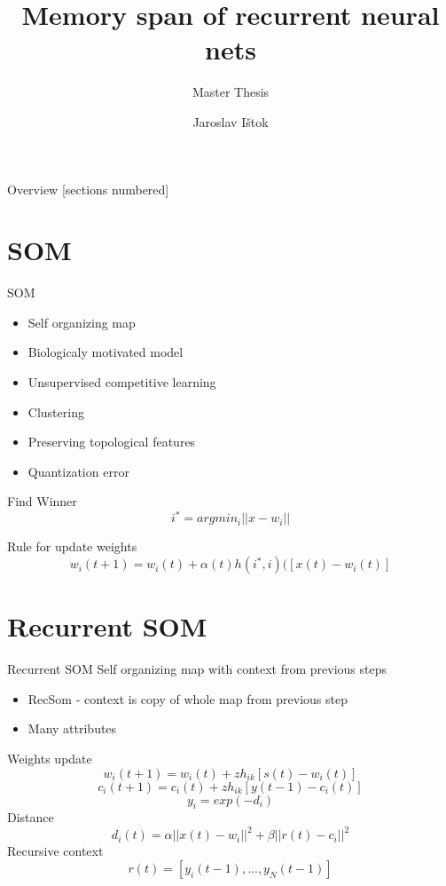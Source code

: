 \documentclass{article}
\title{Memory span of recurrent neural nets}
\subtitle{Master Thesis}
\date{}
\author{Jaroslav Ištok}
\begin{document}
\maketitle

\begin{frame}{Overview}
  [sections numbered]
  \tableofcontents[hideallsubsections]
\end{frame}

\section{SOM}


\begin{frame}[fragile]{SOM}

\begin{itemize}
\item Self organizing map
\item Biologicaly motivated model
\item Unsupervised competitive learning
\item Clustering
\item Preserving topological features
\item Quantization error
\end{itemize}

Find Winner
\begin{equation*}
i^* = argmin_i||x-w_i|| 
\end{equation*}

Rule for update weights
\begin{equation*}
w_i(t+1) = w_i(t) + \alpha(t)h(i^*, i)([x(t) - w_i(t)]
\end{equation*}

\end{frame}

\section{Recurrent SOM}

\begin{frame}[fragile]{Recurrent SOM}
Self organizing map with context from previous steps
\begin{itemize}
\item RecSom - context is copy of whole map from previous step
\item Many attributes
\end{itemize}
Weights update
\begin{equation*}
w_i(t+1) = w_i(t) + zh_{ik}[s(t) - w_i(t)]
\end{equation*}
\begin{equation*}
c_i(t+1) = c_i(t) + zh_{ik}[y(t - 1) - c_i(t)]
\end{equation*}
\begin{equation*}
y_i=exp(-d_i)
\end{equation*}
Distance
\begin{equation*}
d_i(t) = \alpha||x(t)-w_i||^2 + \beta||r(t)-c_i||^2
\end{equation*}
Recursive context
\begin{equation*}
r(t)=[y_i(t-1),...,y_N(t-1)]
\end{equation*}
\end{frame}
\end{document}
